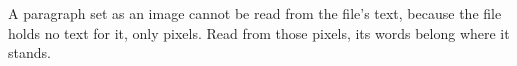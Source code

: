 \documentclass[border=6pt]{standalone}
\begin{document}
\begin{minipage}{9cm}
A paragraph set as an image cannot be read from the file's text, because the file holds
no text for it, only pixels. Read from those pixels, its words belong where it stands.
\end{minipage}
\end{document}
